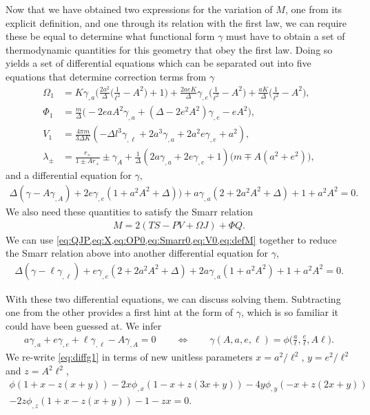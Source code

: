\documentclass[
twoside,
openright,
frontopenright
]{dmathesis}
\newcommand{\nn}{\nonumber}
\begin{document}
Now that we have obtained two expressions for the variation of $M$, one from its
explicit definition, and one through its relation with the first law, we can
require these be equal to determine what functional form $\gamma$ must have to
obtain a set of thermodynamic quantities for this geometry that obey the first
law.  Doing so yields a set of differential equations which can be separated out
into five equations that determine correction terms from $\gamma$
\begin{align}
\Omega_1 &= K \gamma_{,a} \bigg(\frac{2 a^2}{\Delta} \Big(\frac{1}{\ell^2}-A^2\Big)+1\bigg) + \frac{2 a e K}{\Delta}\gamma_{,e} \Big(\frac{1}{\ell^2}-A^2\Big)+\frac{a K}{\Delta} \Big(\frac{1}{\ell^2}-A^2 \Big),\nn\\
\Phi_1 &= \frac{m}{\Delta}\Big(-2 e a A^2\gamma_{,a}+(\Delta-2 e^2 A^2)\gamma_{,e}-eA^2\Big) ,\nn\\
V_1 &= \frac{4 \pi  m }{3 \Delta K}(-\Delta l^3 \gamma_{,\ell}+2 a^3 \gamma_{,a}+2 a^2 e \gamma_{,e}+a^2),\nn\\
\lambda_\pm &= \frac{r_+}{1\pm Ar_+}\pm \gamma_{A} + \frac{1}{\Delta}(2a\gamma_{,a} + 2e \gamma_{,e} + 1)\big(m\mp A(a^2+e^2)\big) ,
\label{eq:corrTermsWithGamma}
\end{align}
and a differential equation for $\gamma$, 
\begin{align}\label{eq:diffg1}
\Delta(\gamma-A\gamma_{,A})+2e\gamma_{,e}(1+a^2A^2+\Delta))+a\gamma_{,a}(2+2a^2A^2+\Delta)+1+a^2A^2=0.
\end{align}
We also need these quantities to satisfy the Smarr relation
\begin{align}
M=2(TS-PV+\Omega J) + \Phi Q.
\end{align}
We can use \cref{eq:QJP,eq:X,eq:OP0,eq:Smarr0,eq:V0,eq:defM} together to reduce
the Smarr relation above into another differential equation for $\gamma$, 
\begin{align}\label{eq:diffg2}
\Delta(\gamma - \ell\gamma_{,\ell}) + e\gamma_{,e}(2+2a^2A^2+\Delta)+2a\gamma_{,a}(1+a^2A^2)+1+a^2A^2 = 0.
\end{align}

With these two differential equations, we can discuss solving them. Subtracting
one from the other provides a first hint at the form of $\gamma$, which is so
familiar it could have been guessed at. We infer 
\begin{align}
a\gamma_{,a} + e\gamma_{,e} + \ell\gamma_{,\ell} - A \gamma_{,A} = 0 \qquad \Longleftrightarrow \qquad \gamma(A,a,e,\ell) = \phi\Big(\frac{a}{\ell}, \frac{e}{\ell}, A\ell\Big).
\end{align}
We re-write \cref{eq:diffg1} in terms of new unitless parameters $x=
a^2/\ell^2$, $y=e^2/\ell^2$ and $z=A^2\ell^2$, 
\begin{multline}
\phi(1+x-z(x+y))-2x \phi_{,x}(1-x+z(3x+y))-4y\phi_{,y}(-x+z(2x+y))\\-2z\phi_{,z}(1+x-z(x+y))-1-zx=0.
\end{multline}
\end{document}
